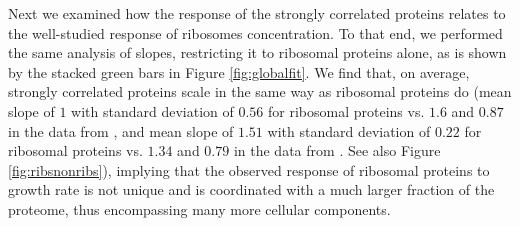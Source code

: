 Next we examined how the response of the strongly correlated proteins relates to the well-studied response of ribosomes concentration.
To that end, we performed the same analysis of slopes, restricting it to ribosomal proteins alone, as is shown by the stacked green bars in Figure \ref{fig:globalfit}.
We find that, on average, strongly correlated proteins scale in the same way as ribosomal proteins do (mean slope of $1$ with standard deviation of $0.56$ for ribosomal proteins vs. $1.6$ and $0.87$ in the data from \cite{Heinemann2015}, and mean slope of $1.51$ with standard deviation of $0.22$ for ribosomal proteins vs. $1.34$ and $0.79$ in the data from \cite{Valgepea2013}. See also Figure \ref{fig:ribsnonribs}), implying that the observed response of ribosomal proteins to growth rate is not unique and is coordinated with a much larger fraction of the proteome, thus encompassing many more cellular components.